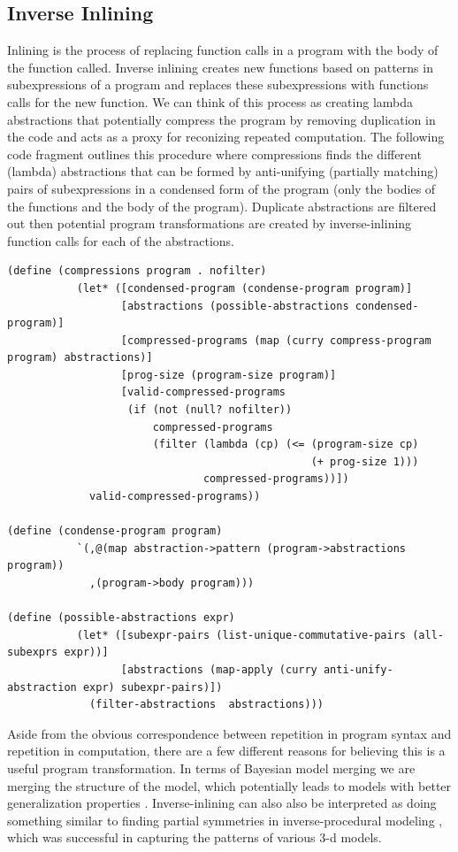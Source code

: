 \documentclass[a4paper,10pt]{article}
\begin{document}
\subsection{Inverse Inlining}
Inlining is the process of replacing function calls in a program with the body of the function called.  Inverse inlining creates new functions based on patterns in subexpressions of a program and replaces these subexpressions with functions calls for the new function.  We can think of this process as creating lambda abstractions that potentially compress the program by removing duplication in the code and acts as a proxy for reconizing repeated computation.  The following code fragment outlines this procedure where compressions finds the different (lambda) abstractions that can be formed by anti-unifying (partially matching) pairs of subexpressions in a condensed form of the program (only the bodies of the functions and the body of the program).  Duplicate abstractions are filtered out then potential program transformations are created by inverse-inlining function calls for each of the abstractions.  

\begin{lstlisting}[frame=trBL]
(define (compressions program . nofilter)
           (let* ([condensed-program (condense-program program)]
                  [abstractions (possible-abstractions condensed-program)]
                  [compressed-programs (map (curry compress-program program) abstractions)]
                  [prog-size (program-size program)]
                  [valid-compressed-programs
                   (if (not (null? nofilter))
                       compressed-programs
                       (filter (lambda (cp) (<= (program-size cp)
                                                (+ prog-size 1)))
                               compressed-programs))])
             valid-compressed-programs))

(define (condense-program program)
           `(,@(map abstraction->pattern (program->abstractions program))
             ,(program->body program)))

(define (possible-abstractions expr)
           (let* ([subexpr-pairs (list-unique-commutative-pairs (all-subexprs expr))]
                  [abstractions (map-apply (curry anti-unify-abstraction expr) subexpr-pairs)])
             (filter-abstractions  abstractions)))
\end{lstlisting}

Aside from the obvious correspondence between repetition in program syntax and repetition in computation, there are a few different reasons for believing this is a useful program transformation.  In terms of Bayesian model merging we are merging the structure of the model, which potentially leads to models with better generalization properties \cite{Stolcke:1994:IPG:645515.658235}.  Inverse-inlining can also also be interpreted as doing something similar to finding partial symmetries in inverse-procedural modeling \cite{DBLP:journals/tog/BokelohWS10}, which was successful in capturing the patterns of various 3-d models.
\end{document}
